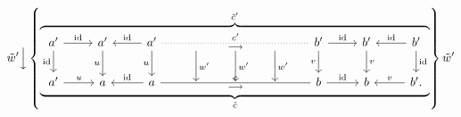 \[
\tilde{w}'\Big\downarrow
\left\{
\overbrace{\underbrace{
\begin{tikzcd}[ampersand replacement=\&]
a' \arrow[r, "\mathrm{id}"] \arrow[d, "\mathrm{id}"'] \& a' \arrow[d, "u"'] \& a' \arrow[l, "\mathrm{id}"'] \arrow[d, "u"'] \arrow[rrrr, dotted, no head, "c'", "\longrightarrow"'] \& {} \arrow[d, "w'"] \& {} \arrow[d, "w'"] \& {} \arrow[d, "w'"] \& b' \arrow[r, "\mathrm{id}"] \arrow[d, "v"'] \& b' \arrow[d, "v"] \& b' \arrow[l, "\mathrm{id}"'] \arrow[d, "\mathrm{id}"] \\
a' \arrow[r, "u"] \& a \& a \arrow[l, "\mathrm{id}"'] \arrow[rrrr, no head, "c", "\longrightarrow"'] \& {} \& {} \& {} \& b \arrow[r, "\mathrm{id}"] \& b \& b'. \arrow[l, "v"']
\end{tikzcd}
}_{\tilde{c}}}^{\tilde{c}'}
\right\}
\tilde{w}'
\]

